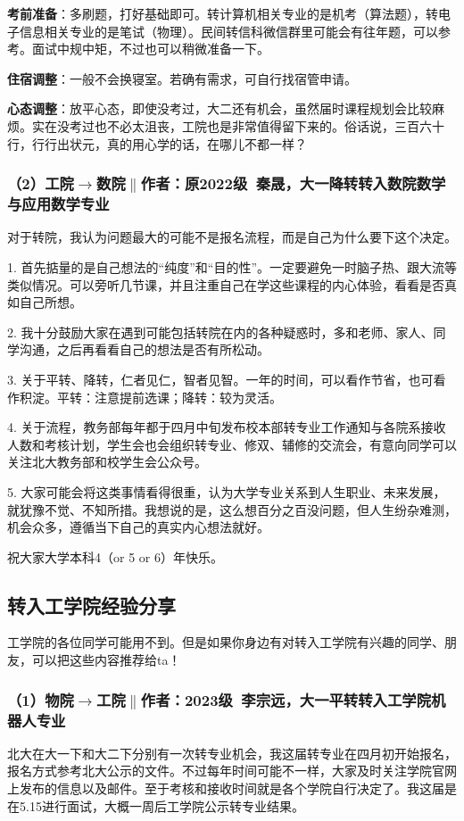 \documentclass[11pt,oneside]{book}
\begin{document}
\vspace{10pt}

\textbf{考前准备}：多刷题，打好基础即可。转计算机相关专业的是机考（算法题），转电子信息相关专业的是笔试（物理）。民间转信科微信群里可能会有往年题，可以参考。面试中规中矩，不过也可以稍微准备一下。

\vspace{10pt}

\textbf{住宿调整}：一般不会换寝室。若确有需求，可自行找宿管申请。

\vspace{10pt}

\textbf{心态调整}：放平心态，即使没考过，大二还有机会，虽然届时课程规划会比较麻烦。实在没考过也不必太沮丧，工院也是非常值得留下来的。俗话说，三百六十行，行行出状元，真的用心学的话，在哪儿不都一样？

\subsubsection{（2）工院$\to$数院$\parallel$作者：原2022级\ 秦晟，大一降转转入数院数学与应用数学专业}
对于转院，我认为问题最大的可能不是报名流程，而是自己为什么要下这个决定。

1. 首先掂量的是自己想法的“纯度”和“目的性”。一定要避免一时脑子热、跟大流等类似情况。可以旁听几节课，并且注重自己在学这些课程的内心体验，看看是否真如自己所想。

2. 我十分鼓励大家在遇到可能包括转院在内的各种疑惑时，多和老师、家人、同学沟通，之后再看看自己的想法是否有所松动。

3. 关于平转、降转，仁者见仁，智者见智。一年的时间，可以看作节省，也可看作积淀。平转：注意提前选课；降转：较为灵活。

4. 关于流程，教务部每年都于四月中旬发布校本部转专业工作通知与各院系接收人数和考核计划，学生会也会组织转专业、修双、辅修的交流会，有意向同学可以关注北大教务部和校学生会公众号。

5. 大家可能会将这类事情看得很重，认为大学专业关系到人生职业、未来发展，就犹豫不觉、不知所措。我想说的是，这么想百分之百没问题，但人生纷杂难测，机会众多，遵循当下自己的真实内心想法就好。

祝大家大学本科4（or 5 or 6）年快乐。


\subsection{转入工学院经验分享}
工学院的各位同学可能用不到。但是如果你身边有对转入工学院有兴趣的同学、朋友，可以把这些内容推荐给ta！
\subsubsection{（1）物院$\to$工院$\parallel$作者：2023级\ 李宗远，大一平转转入工学院机器人专业}
北大在大一下和大二下分别有一次转专业机会，我这届转专业在四月初开始报名，报名方式参考北大公示的文件。不过每年时间可能不一样，大家及时关注学院官网上发布的信息以及邮件。至于考核和接收时间就是各个学院自行决定了。我这届是在5.15进行面试，大概一周后工学院公示转专业结果。
\end{document}
